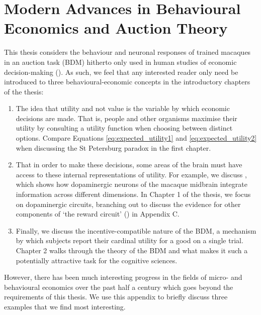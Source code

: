 \chapter{Modern Advances in Behavioural Economics and Auction Theory} 

\ifpdf
    \graphicspath{{Appendix1.1/Figs/Raster/}{Appendix1.1/Figs/PDF/}{Appendix1.1/Figs/}}
\else
    \graphicspath{{Appendix1.1/Figs/Vector/}{Appendix1.1/Figs/}}
\fi


This thesis considers the behaviour and neuronal responses of trained macaques in an auction task (BDM) hitherto only used in human studies of economic decision-making (\cite{newtonfennerEconomicValueBrain2023}). As such, we feel that any interested reader only need be introduced to three behavioural-economic concepts in the introductory chapters of the thesis:

\begin{enumerate}
    \item The idea that utility and not value is the variable by which economic decisions are made. That is, people and other organisms maximise their utility by consulting a utility function when choosing between distinct options. Compare Equations \ref{eq:expected_utility1} and \ref{eq:expected_utility2} when discussing the St Petersburg paradox in the first chapter.
    \item That in order to make these decisions, some areas of the brain must have access to these internal representations of utility. For example, we discuss \cite{lakDopaminePredictionError2014}, which shows how dopaminergic neurons of the macaque midbrain integrate information across different dimensions. In Chapter 1 of the thesis, we focus on dopaminergic circuits, branching out to discuss the evidence for other components of ‘the reward circuit’ (\cite{haberRewardCircuitLinking2010}) in Appendix C.
    \item Finally, we discuss the incentive-compatible nature of the BDM, a mechanism by which subjects report their cardinal utility for a good on a single trial. Chapter 2 walks through the theory of the BDM and what makes it such a potentially attractive task for the cognitive sciences.
\end{enumerate}

However, there has been much interesting progress in the fields of micro- and behavioural economics over the past half a century which goes beyond the requirements of this thesis. We use this appendix to briefly discuss three examples that we find most interesting.

